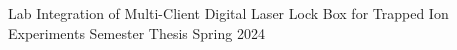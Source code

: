 \documentclass{project-proposal}
\begin{document}
\setmaintextfont
\makepage
\makeheader
{Lab Integration of Multi-​Client Digital Laser Lock Box for Trapped Ion Experiments} %
{Semester Thesis} %
{Spring 2024} %
\end{document}
